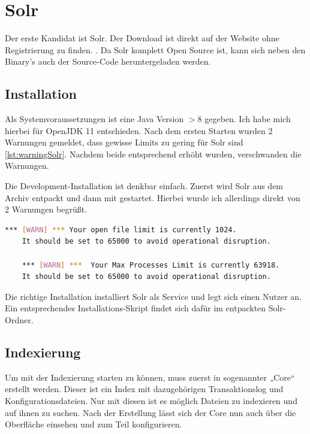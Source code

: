 
\section{Solr}

Der erste Kandidat ist Solr. Der Download ist direkt auf der Website ohne Registrierung zu finden. \cite{TheApacheSoftwareFoundation.2019}. Da Solr komplett Open Source ist, kann sich neben den Binary’s auch der Source-Code heruntergeladen werden. 

\subsection{Installation}

Als Systemvoraussetzungen ist eine Java Version $> 8$ gegeben. Ich habe mich hierbei für OpenJDK 11 entschieden. 
Nach dem ersten Starten wurden 2 Warnungen gemeldet, dass gewisse Limits zu gering für Solr sind \ref{lst:warningSolr}. Nachdem beide entsprechend erhöht wurden, verschwanden die Warnungen.

Die Development-Installation ist denkbar einfach. Zuerst wird Solr aus dem Archiv entpackt und dann mit  gestartet. Hierbei wurde ich allerdings direkt von 2 Warnungen begrüßt. 

\begin{lstlisting}[language=bash, frame=single, label={lst:warningSolr}] 
    *** [WARN] *** Your open file limit is currently 1024.
    It should be set to 65000 to avoid operational disruption.

    *** [WARN] ***  Your Max Processes Limit is currently 63918.
    It should be set to 65000 to avoid operational disruption.
\end{lstlisting}

Die richtige Installation installiert Solr als Service und legt sich einen Nutzer an. Ein entsprechendes Installations-Skript findet sich dafür im entpackten Solr-Ordner.

\subsection{Indexierung}

Um mit der Indexierung starten zu können, muss zuerst in sogenannter „Core“ erstellt werden. Dieser ist ein Index mit dazugehörigen Transaktionslog und Konfigurationsdateien. Nur mit diesen ist es möglich Dateien zu indexieren und auf ihnen zu suchen. Nach der Erstellung lässt sich der Core nun auch über die Oberfläche einsehen und zum Teil konfigurieren.

